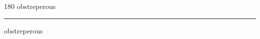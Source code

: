 
\begin{frame}
\begin{center}
\begin{turn}{180}
{\fontsize{2.5cm}{1em}\selectfont obstreperous}
\end{turn}
\vspace{1em}\par  
\hrule
\vspace{1em}\par  
{\fontsize{2.5cm}{1em}\selectfont obstreperous}
\end{center}
\end{frame}
